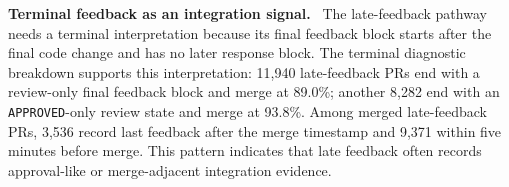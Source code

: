 \documentclass[10pt,conference,anonymous]{IEEEtran}
\newcommand{\runinhead}[1]{\noindent\textbf{#1.}\ }
\begin{document}
\runinhead{Terminal feedback as an integration signal}
The late-feedback pathway needs a terminal interpretation because its final feedback block starts after the final code change and has no later response block.
The terminal diagnostic breakdown supports this interpretation: 11,940 late-feedback PRs end with a review-only final feedback block and merge at 89.0\%; another 8,282 end with an \texttt{APPROVED}-only review state and merge at 93.8\%.
Among merged late-feedback PRs, 3,536 record last feedback after the merge timestamp and 9,371 within five minutes before merge.
This pattern indicates that late feedback often records approval-like or merge-adjacent integration evidence.
\end{document}
